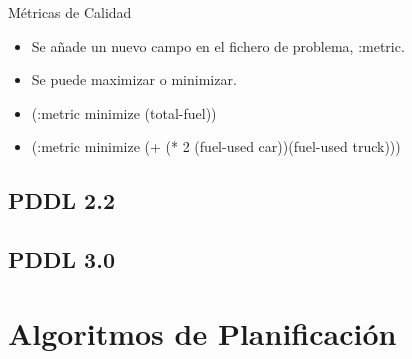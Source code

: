 \documentclass[12pt, twoside, openright]{report} %
\begin{document}
Métricas de Calidad
\begin{itemize}
	\item Se añade un nuevo campo en el fichero de problema, :metric.
	\item Se puede maximizar o minimizar.
	\item (:metric minimize (total-fuel))
	\item (:metric minimize (+ (* 2 (fuel-used car))(fuel-used truck)))
\end{itemize}
\subsection{PDDL 2.2}

\subsection{PDDL 3.0}

\section{Algoritmos de Planificación}
\end{document}

